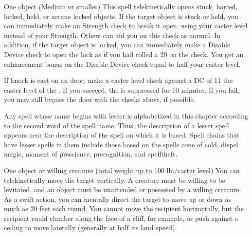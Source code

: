 \begin{comment}
\subsubsection{J-L}
\end{comment}

\spellrng{\rngclose}
\begin{spelltarget}{One object (Medium or smaller)}
    \spelleffect This spell telekinetically opens stuck, barred, locked, held, or arcane locked objects. If the target object is stuck or held, you can immediately make an Strength check to break it open, using your caster level instead of your Strength. Others can aid you on this check as normal. In addition, if the target object is locked, you can immediately make a Disable Device check to open the lock as if you had rolled a 20 on the check. You get an enhancement bonus on the Disable Device check equal to half your caster level.
\end{spelltarget}
\spellnotes If knock is cast on an  door, make a caster level check against a DC of 11 \add the caster level of the . If you succeed, the  is suppressed for 10 minutes. If you fail, you may still bypass the door with the checks above, if possible.

\par Any spell whose name begins with lesser is alphabetized in this chapter according to the second word of the spell name. Thus, the description of a lesser spell appears near the description of the spell on which it is based. Spell chains that have lesser spells in them include those based on the spells cone of cold, dispel magic, moment of prescience, precognition, and spelltheft.

\spellrng{\rngclose}
\spelldur{\durshort \dismissable}
\begin{spelltarget}{One object or willing creature (total weight up to 100 lb./caster level)}
    \spelleffect You can telekinetically move the target vertically. A creature must be willing to be levitated, and an object must be unattended or possessed by a willing creature. As a swift action, you can mentally direct the target to move up or down as much as 20 feet each round. You cannot move the recipient horizontally, but the recipient could clamber along the face of a cliff, for example, or push against a ceiling to move laterally (generally at half its land speed).
\end{spelltarget}


